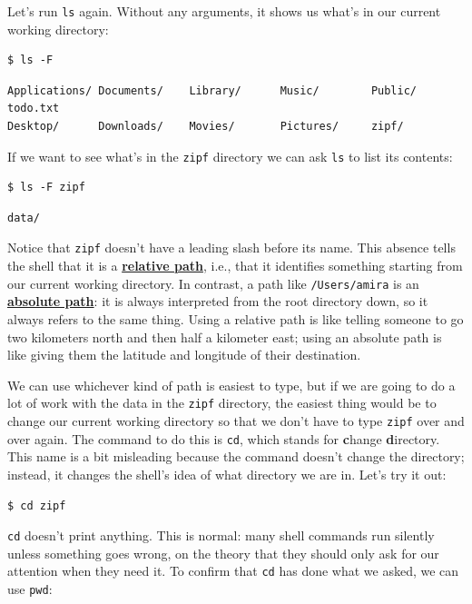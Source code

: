 \documentclass[
]{krantz}
\newcommand{\gref}[2]{\hyperlink{#2}{\textbf{#1}}}
\begin{document}
Let's run \texttt{ls} again.
Without any arguments,
it shows us what's in our current working directory:

\begin{verbatim}
$ ls -F
\end{verbatim}

\begin{verbatim}
Applications/ Documents/    Library/      Music/        Public/        todo.txt
Desktop/      Downloads/    Movies/       Pictures/     zipf/
\end{verbatim}

If we want to see what's in the \texttt{zipf} directory
we can ask \texttt{ls} to list its contents:

\begin{verbatim}
$ ls -F zipf
\end{verbatim}

\begin{verbatim}
data/
\end{verbatim}

Notice that \texttt{zipf} doesn't have a leading slash before its name.
This absence tells the shell that it is a \gref{relative path}{relative\_path},
i.e.,
that it identifies something starting from our current working directory.
In contrast,
a path like \texttt{/Users/amira} is an \gref{absolute path}{absolute\_path}:
it is always interpreted from the root directory down,
so it always refers to the same thing.
Using a relative path is like telling someone to go two kilometers north and then half a kilometer east;
using an absolute path is like giving them the latitude and longitude of their destination.

We can use whichever kind of path is easiest to type,
but if we are going to do a lot of work with the data in the \texttt{zipf} directory,
the easiest thing would be to change our current working directory
so that we don't have to type \texttt{zipf} over and over again.
The command to do this is \texttt{cd},
which stands for \textbf{c}hange \textbf{d}irectory.
This name is a bit misleading because the command doesn't change the directory;
instead, it changes the shell's idea of what directory we are in.
Let's try it out:

\begin{verbatim}
$ cd zipf
\end{verbatim}

\texttt{cd} doesn't print anything.
This is normal:
many shell commands run silently unless something goes wrong,
on the theory that they should only ask for our attention when they need it.
To confirm that \texttt{cd} has done what we asked,
we can use \texttt{pwd}:
\end{document}
